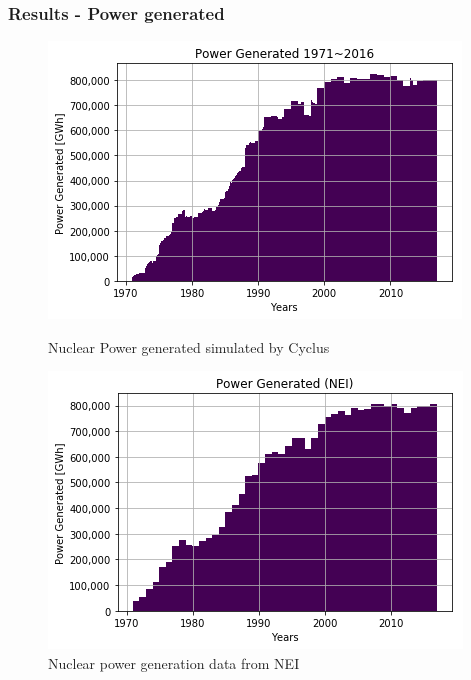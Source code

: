 \begin{frame}
    \frametitle{Results - Power generated}
\begin{figure}[htbp!]
\begin{minipage}[b]{.45\linewidth}
    \begin{center}
        \includegraphics[width=\textwidth]{./images/sim_output/us/cyc_pow.png}
    \end{center}
    \caption{Nuclear Power generated simulated by Cyclus}
\end{minipage}
\hspace{.5cm}
\begin{minipage}[b]{.45\linewidth}
    \centering
        \includegraphics[width=\linewidth]{./images/sim_output/us/nei_pow.png}
    \caption{Nuclear power generation data from NEI \footnotemark}
\end{minipage}
\end{figure}
\end{frame}

